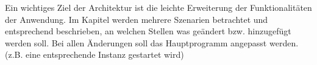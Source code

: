 Ein wichtiges Ziel der Architektur ist die leichte Erweiterung der Funktionalitäten der Anwendung. 
Im Kapitel werden mehrere Szenarien betrachtet und entsprechend beschrieben, an welchen Stellen was geändert bzw.
hinzugefügt werden soll. Bei allen Änderungen soll das Hauptprogramm angepasst werden.
(z.B. eine entsprechende Instanz gestartet wird)
